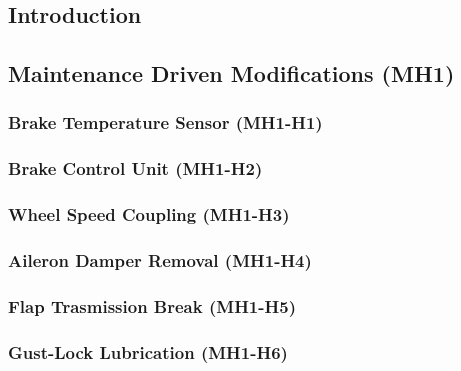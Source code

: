 \subsection{Introduction}
    

\subsection{Maintenance Driven Modifications (MH1)}
    \subsubsection{Brake Temperature Sensor (MH1-H1)}
        
    \subsubsection{Brake Control Unit (MH1-H2)}
        
    \subsubsection{Wheel Speed Coupling (MH1-H3)}
        
    \subsubsection{Aileron Damper Removal (MH1-H4)}
        
    \subsubsection{Flap Trasmission Break (MH1-H5)}
        
    \subsubsection{Gust-Lock Lubrication (MH1-H6)}
        
